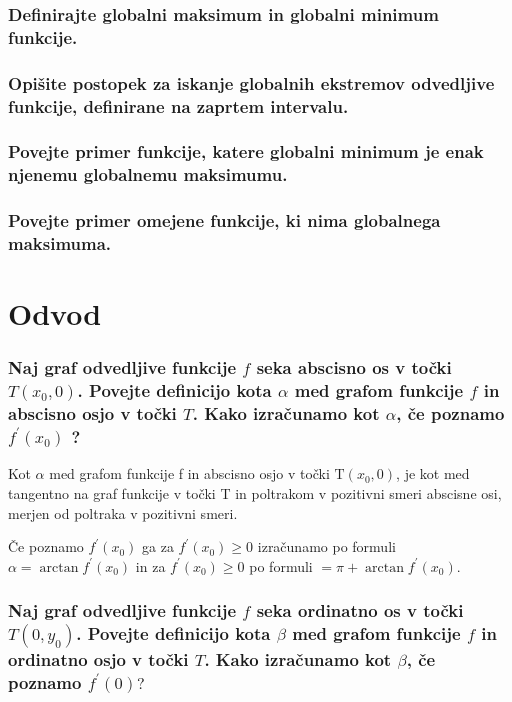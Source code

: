 \documentclass{article}
\begin{document}
\subsubsection*{Definirajte globalni maksimum in globalni minimum funkcije.}



\subsubsection*{Opišite postopek za iskanje globalnih ekstremov odvedljive funkcije, definirane na zaprtem intervalu.}



\subsubsection*{Povejte primer funkcije, katere globalni minimum je enak njenemu globalnemu maksimumu.}



\subsubsection*{Povejte primer omejene funkcije, ki nima globalnega maksimuma.}



\section{Odvod}
\subsubsection*{Naj graf odvedljive funkcije $f$ seka abscisno os v točki $T\left(x_{0}, 0\right)$. Povejte definicijo kota $\alpha$ med grafom funkcije $f$ in abscisno osjo v točki $T$. Kako izračunamo kot $\alpha$, če poznamo $f^{\prime}\left(x_{0}\right)$ ?}

Kot $\alpha$ med grafom funkcije f in abscisno osjo v točki $\mathrm{T}\left(x_{0}, 0\right)$, je kot med tangentno na graf funkcije v točki T in poltrakom v pozitivni smeri abscisne osi, merjen od poltraka v pozitivni smeri.

Če poznamo $f^{\prime}\left(x_{0}\right)$ ga za $f^{\prime}\left(x_{0}\right) \geq 0$ izračunamo po formuli $\alpha=\arctan f^{\prime}\left(x_{0}\right)$ in za $f^{\prime}\left(x_{0}\right) \geq 0$ po formuli $=\pi+\arctan f^{\prime}\left(x_{0}\right)$.

\subsubsection*{Naj graf odvedljive funkcije $f$ seka ordinatno os v točki $T\left(0, y_{0}\right)$. Povejte definicijo kota $\beta$ med grafom funkcije $f$ in ordinatno osjo v točki $T$. Kako izračunamo kot $\beta$, če poznamo $f^{\prime}(0) ?$}
\end{document}
